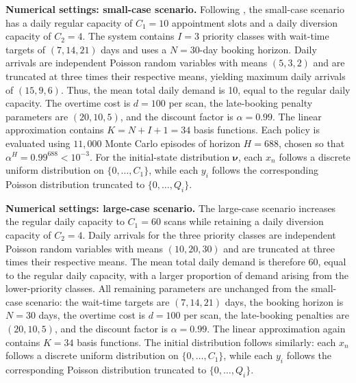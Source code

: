 \documentclass[sglanonrev]{informs4}
\providecommand{\bnu}{\boldsymbol{\nu}}
\begin{document}
\begin{APPENDICES}
\textbf{Numerical settings: small-case scenario.} Following \citet{patrick2008dynamic}, the small-case scenario has a daily regular capacity of $C_1=10$ appointment slots and a daily diversion capacity of $C_2=4$. The system contains $I=3$ priority classes with wait-time targets of $(7,14,21)$ days and uses a $N=30$-day booking horizon. Daily arrivals are independent Poisson random variables with means $(5,3,2)$ and are truncated at three times their respective means, yielding maximum daily arrivals of $(15,9,6)$. Thus, the mean total daily demand is 10, equal to the regular daily capacity. The overtime cost is $d=100$ per scan, the late-booking penalty parameters are $(20,10,5)$, and the discount factor is $\alpha=0.99$. The linear approximation contains $K=N+I+1=34$ basis functions. Each policy is evaluated using $11{,}000$ Monte Carlo episodes of horizon $H=688$, chosen so that $\alpha^H=0.99^{688}<10^{-3}$. For the initial-state distribution $\bnu$, each $x_n$ follows a discrete uniform distribution on $\{0,\ldots,C_1\}$, while each $y_i$ follows the corresponding Poisson distribution truncated to $\{0,\ldots,Q_i\}$.

\textbf{Numerical settings: large-case scenario.} The large-case scenario increases the regular daily capacity to $C_1=60$ scans while retaining a daily diversion capacity of $C_2=4$. Daily arrivals for the three priority classes are independent Poisson random variables with means $(10,20,30)$ and are truncated at three
times their respective means. The mean total daily demand is therefore 60, equal to the regular daily capacity, with a larger proportion of demand arising from the lower-priority classes. All remaining parameters are unchanged from the small-case scenario: the wait-time targets are $(7,14,21)$ days, the booking horizon is $N=30$ days, the overtime cost is $d=100$ per scan, the late-booking penalties are $(20,10,5)$, and the discount factor is $\alpha=0.99$. The linear approximation  again contains $K=34$ basis functions. The initial distribution follows similarly: each $x_n$ follows a discrete uniform distribution on $\{0,\ldots,C_1\}$, while each $y_i$ follows the corresponding Poisson distribution truncated to $\{0,\ldots,Q_i\}$.


\end{APPENDICES}
\end{document}
